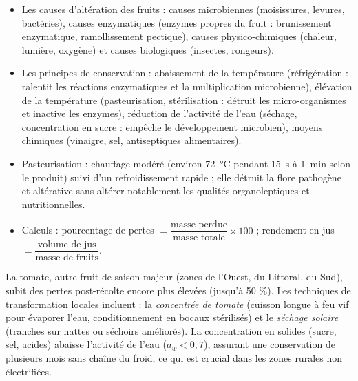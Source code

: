 \documentclass[11pt]{article}
\newcommand{\cle}[1]{{\popxbold\color{popdark}#1}}
\newcounter{popsec}
\newcounter{popsub}
\newcommand{\courssub}[1]{%
  \stepcounter{popsub}%
  \par\vspace{9pt}\noindent{\popxbold\fontsize{11.5}{13}\selectfont\color{popink}{\color{poporange}\thepopsec.\thepopsub}\hspace{6pt}#1}\par\nopagebreak\vspace{4pt}
}
\begin{document}
\begin{aretenir}
\begin{itemize}
\item Les causes d'altération des fruits : causes \cle{microbiennes} (moisissures, levures, bactéries), causes \cle{enzymatiques} (enzymes propres du fruit : brunissement enzymatique, ramollissement pectique), causes \cle{physico-chimiques} (chaleur, lumière, oxygène) et causes \cle{biologiques} (insectes, rongeurs).
\item Les principes de conservation : \cle{abaissement de la température} (réfrigération : ralentit les réactions enzymatiques et la multiplication microbienne), \cle{élévation de la température} (pasteurisation, stérilisation : détruit les micro-organismes et inactive les enzymes), \cle{réduction de l'activité de l'eau} (séchage, concentration en sucre : empêche le développement microbien), \cle{moyens chimiques} (vinaigre, sel, antiseptiques alimentaires).
\item Pasteurisation : chauffage modéré (environ \SI{72}{\celsius} pendant \SI{15}{s} à \SI{1}{min} selon le produit) suivi d'un refroidissement rapide ; elle détruit la flore pathogène et altérative sans altérer notablement les qualités organoleptiques et nutritionnelles.
\item Calculs : pourcentage de pertes $= \dfrac{\text{masse perdue}}{\text{masse totale}} \times 100$ ; rendement en jus $= \dfrac{\text{volume de jus}}{\text{masse de fruits}}$.
\end{itemize}
\end{aretenir}

\begin{savaistu}
La tomate, autre fruit de saison majeur (zones de l'Ouest, du Littoral, du Sud), subit des pertes post-récolte encore plus élevées (jusqu'à 50 \%). Les techniques de transformation locales incluent : la \emph{concentrée de tomate} (cuisson longue à feu vif pour évaporer l'eau, conditionnement en bocaux stérilisés) et le \emph{séchage solaire} (tranches sur nattes ou séchoirs améliorés). La concentration en solides (sucre, sel, acides) abaisse l'activité de l'eau ($a_w < 0,7$), assurant une conservation de plusieurs mois sans chaîne du froid, ce qui est crucial dans les zones rurales non électrifiées.
\end{savaistu}

\courssub{Démarche et corrigé commenté}
\end{document}
